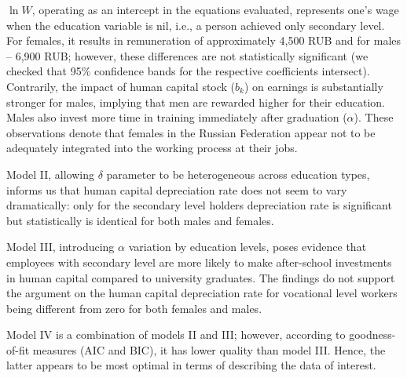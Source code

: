 \documentclass[12pt,a4paper]{article}
\numberwithin{equation}{section}
\begin{document}
$\ln W$, operating as an intercept in the equations evaluated, represents one's wage when the education variable is nil, i.e., a person achieved only secondary level. For females, it results in remuneration of approximately 4,500 RUB and for males -- 6,900 RUB; however, these differences are not statistically significant (we checked that 95\% confidence bands for the respective coefficients intersect). Contrarily, the impact of human capital stock ($b_k$) on earnings is substantially stronger for males, implying that men are rewarded higher for their education. Males also invest more time in training immediately after graduation ($\alpha$). These observations denote that females in the Russian Federation appear not to be adequately integrated into the working process at their jobs. 

Model II, allowing $\delta$ parameter to be heterogeneous across education types, informs us that human capital depreciation rate does not seem to vary dramatically: only for the secondary level holders depreciation rate is significant but statistically is identical for both males and females. 

Model III, introducing $\alpha$ variation by education levels, poses evidence that employees with secondary level are more likely to make after-school investments in human capital compared to university graduates. The findings do not support the argument on the human capital depreciation rate for vocational level workers being different from zero for both females and males.

Model IV is a combination of models II and III; however, according to goodness-of-fit measures (AIC and BIC), it has lower quality than model III. Hence, the latter appears to be most optimal in terms of describing the data of interest.
\end{document}
